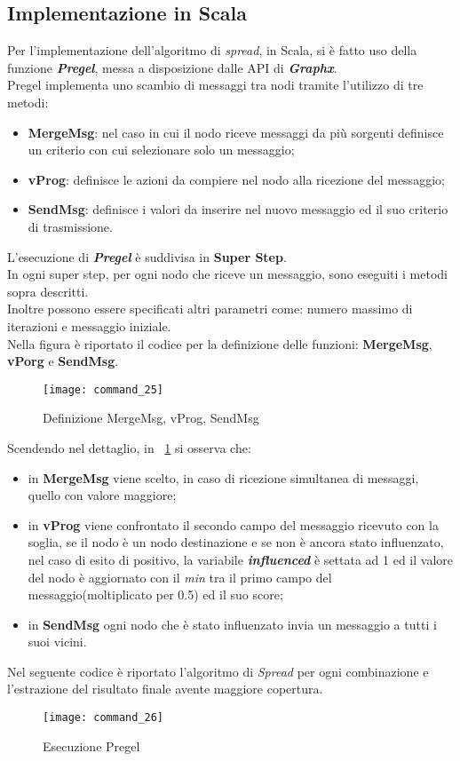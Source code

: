 \subsection{Implementazione in Scala}
Per l'implementazione dell'algoritmo di \textit{spread}, in Scala, si è fatto uso
della funzione \textit{\textbf{Pregel}}, messa a disposizione dalle API di
\textit{\textbf{Graphx}}.\\
Pregel implementa uno scambio di messaggi tra nodi tramite l'utilizzo di tre
metodi:
\begin{itemize}
	\item \textbf{MergeMsg}: nel caso in cui il nodo riceve messaggi da più sorgenti
	definisce un criterio con cui selezionare solo un messaggio;
	\item \textbf{vProg}: definisce le azioni da compiere nel nodo alla ricezione del messaggio;
	\item \textbf{SendMsg}: definisce i valori da inserire nel nuovo messaggio ed
	il suo criterio di trasmissione.
\end{itemize}
L'esecuzione di \textit{\textbf{Pregel}} è suddivisa in \textbf{Super Step}.\\
In ogni super step, per ogni nodo che riceve un messaggio, sono eseguiti i metodi
sopra descritti.\\
Inoltre possono essere specificati altri parametri come: numero massimo di
iterazioni e messaggio iniziale.\\
Nella figura è riportato il codice per la definizione delle funzioni:
\textbf{MergeMsg}, \textbf{vPorg} e \textbf{SendMsg}.
\begin{figure}[!htbp]
  \texttt{[image: command\_25]}
  \caption{Definizione MergeMsg, vProg, SendMsg}
  \label{command_25}
\end{figure}
\clearpage
Scendendo nel dettaglio, in \figurename~\ref{command_25} si osserva che:
\begin{itemize}
	\item in \textbf{MergeMsg} viene scelto, in caso di ricezione simultanea di
	messaggi, quello con valore maggiore;
	\item in \textbf{vProg} viene confrontato il secondo campo del messaggio ricevuto
	con la soglia, se il nodo è un nodo destinazione e se non è ancora
	stato influenzato, nel caso di esito di positivo, la variabile
	\textit{\textbf{influenced}} è settata ad 1 ed il valore del nodo è aggiornato
	con il \textit{min} tra il primo campo del messaggio(moltiplicato per 0.5) ed il suo score;
	\item in \textbf{SendMsg} ogni nodo che è stato influenzato invia un messaggio
	a tutti i suoi vicini.
\end{itemize}
Nel seguente codice è riportato l'algoritmo di \textit{Spread} per ogni
combinazione e l'estrazione del risultato finale avente maggiore copertura.
\begin{figure}[!htbp]
  \texttt{[image: command\_26]}
  \caption{Esecuzione Pregel}
  \label{command_26}
\end{figure}
\clearpage
